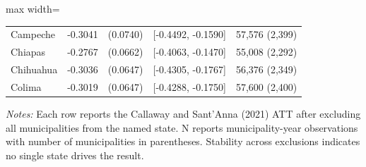 \begin{table}[htbp]
\begin{adjustbox}{max width=\textwidth}
\begin{tabular}{lcccc}
Campeche & -0.3041 & (0.0740) & [-0.4492, -0.1590] & 57,576 (2,399) \\
Chiapas & -0.2767 & (0.0662) & [-0.4063, -0.1470] & 55,008 (2,292) \\
Chihuahua & -0.3036 & (0.0647) & [-0.4305, -0.1767] & 56,376 (2,349) \\
Colima & -0.3019 & (0.0647) & [-0.4288, -0.1750] & 57,600 (2,400) \\
\bottomrule
\end{tabular}
\end{adjustbox}
\begin{tablenotes}[flushleft]
\small
\item \textit{Notes:} Each row reports the Callaway and Sant'Anna (2021) ATT after excluding all municipalities from the named state. N reports municipality-year observations with number of municipalities in parentheses. Stability across exclusions indicates no single state drives the result.
\end{tablenotes}
\end{table}
